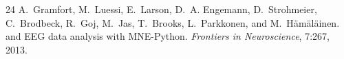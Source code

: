 \documentclass[11pt,a4paper]{article}
\begin{document}
\begin{thebibliography}{24}
A.~Gramfort, M.~Luessi, E.~Larson, D.~A. Engemann, D.~Strohmeier, C.~Brodbeck,
  R.~Goj, M.~Jas, T.~Brooks, L.~Parkkonen, and M.~H{\"a}m{\"a}l{\"a}inen.
 and {EEG} data analysis with {MNE-Python}.
\newblock \emph{Frontiers in Neuroscience}, 7:267, 2013.

\end{thebibliography}
\end{document}
